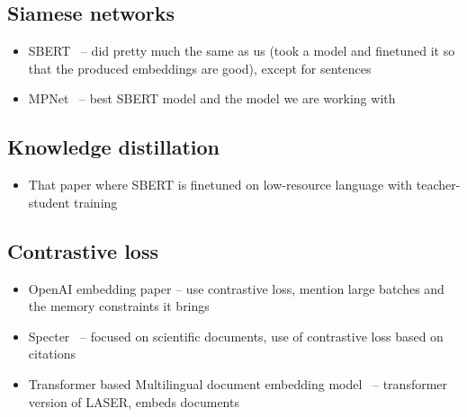 \subsection{Siamese networks}


\begin{itemize}

      \item SBERT~\cite{reimers2019sentence} -- did pretty much the same as us
        (took a model and finetuned it so that the produced embeddings are good),
        except for sentences

      \item MPNet~\cite{song2020mpnet} -- best SBERT model and the model we are
        working with

\end{itemize}

\subsection{Knowledge distillation}

\begin{itemize}

      \item That paper where SBERT is finetuned on low-resource language with
          teacher-student training~\cite{reimers2020making}

\end{itemize}

\subsection{Contrastive loss}

\begin{itemize}

      \item OpenAI embedding paper -- use contrastive loss, mention large batches
        and the memory constraints it brings

      \item Specter~\cite{cohan2020specter} -- focused on scientific documents, use
        of contrastive loss based on citations

      \item Transformer based Multilingual document embedding
        model~\cite{li2020transformer} -- transformer version of LASER, embeds
        documents

\end{itemize}

